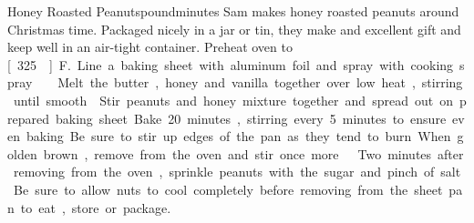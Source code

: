 \begin{recipe}{Honey Roasted Peanuts}{\unit[1]{pound}}{\unit[40]{minutes}}
\freeform Sam makes honey roasted peanuts around Christmas time. Packaged nicely in a jar or tin, they make and excellent gift and keep well in an air-tight container.
\newstep Preheat oven to \unit[325\0]{F.} Line a baking sheet with aluminum foil and spray with cooking spray. 
Melt the butter, honey and vanilla together over low heat, stirring until smooth.
Stir peanuts and honey mixture together and spread out on prepared baking sheet. Bake 20 minutes, stirring every 5 minutes to ensure even baking. Be sure to stir up edges of the pan as they tend to burn. When golden brown, remove from the oven and stir once more.
Two minutes after removing from the oven, sprinkle peanuts with the sugar and pinch of salt. Be sure to allow nuts to cool completely before removing from the sheet pan to eat, store or package.
\end{recipe}